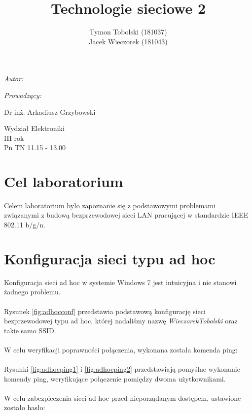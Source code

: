 \documentclass[wide,a4paper,titlepage,12pt] {article}
\title{Technologie sieciowe 2}
\author{Tymon Tobolski (181037)\\ Jacek Wieczorek (181043)}
\makeatletter
\renewcommand{\maketitle}{
\begin{titlepage}
  \begin{center}
    \vspace*{3cm}
    \LARGE \@title \par
    \vspace{2cm}
    \textit{\small Autor:}\par
    \normalsize \@author\par \normalsize
    \vspace{3cm}
    \textit{\small Prowadzący:}\par
    Dr inż. Arkadiusz Grzybowski\par
    \vspace{2cm}
    Wydział Elektroniki\\ III rok\\ Pn TN 11.15 - 13.00\par
    \vspace{4cm}
    \small \@date
  \end{center}
\end{titlepage}
}
\makeatother
\begin{document}
\maketitle
\section{Cel laboratorium}
\paragraph{}
Celem laboratorium było zapoznanie się z podstawowymi problemami związanymi z budową bezprzewodowej sieci LAN pracującej w standardzie IEEE 802.11 b/g/n.

\section{Konfiguracja sieci typu ad hoc} %
\label{sec:}
Konfiguracja sieci ad hoc w systemie Windows 7 jest intuicyjna i nie stanowi żadnego problemu. 


\paragraph{} %
\label{par:}
Rysunek \ref{fig:adhocconf} przedstawia podstawową konfigurację sieci bezprzewodowej typu ad hoc, której nadaliśmy nazwę \textit{WieczorekTobolski} oraz takie samo SSID. 
\paragraph{} %
\label{par:}
W celu weryfikacji poprawności połączenia, wykonana została komenda ping:



\paragraph{} %
\label{par:}
Rysunki \ref{fig:adhocping1} i \ref{fig:adhocping2} przedstawiają pomyślne wykonanie komendy ping, weryfikujące połączenie pomiędzy dwoma użytkownikami.
\newpage
\paragraph{} %
\label{par:}
W celu zabezpieczenia sieci ad hoc przed nieporządanym dostępem, ustawione zostało hasło:
\end{document}
